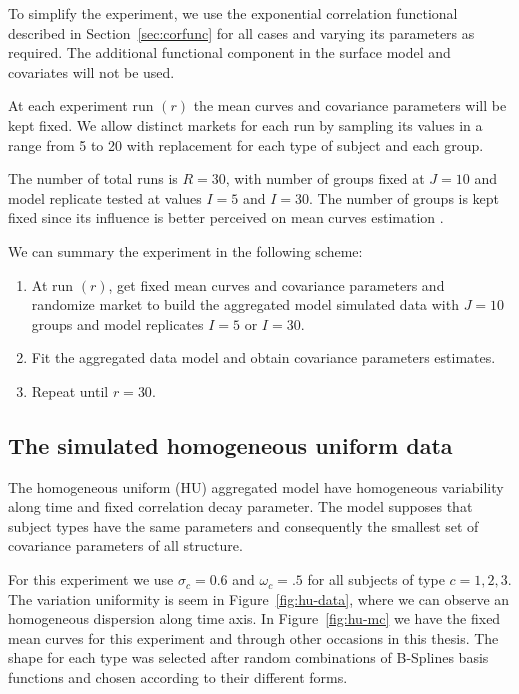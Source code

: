To simplify the experiment, we use the exponential correlation functional described in Section~\ref{sec:corfunc} for all cases and varying its parameters as required. The additional functional component in the surface model and covariates will not be used.%

At each experiment run $(r)$ the mean curves and covariance parameters will be kept fixed. We allow distinct markets for each run by sampling its values in a range from 5 to 20 with replacement for each type of subject and each group. 

The number of total runs is $R=30$, with number of groups fixed at $J=10$ and model replicate tested at values $I=5$ and $I=30$. The number of groups is kept fixed since its influence is better perceived on mean curves estimation \cite{dias2009non,dias2013hierarchical}.

We can summary the experiment in the following scheme:

\begin{enumerate}
\item At run $(r)$, get fixed mean curves and covariance parameters and randomize market to build the aggregated model simulated data with $J=10$ groups and model replicates $I=5$ or $I=30$.
\item Fit the aggregated data model and obtain covariance parameters estimates.
\item Repeat until $r=30$.
\end{enumerate}





\subsection{The simulated homogeneous uniform data}
\label{sec:hu-fit}


The homogeneous uniform (HU) aggregated model have homogeneous variability along time and fixed correlation decay parameter. The model supposes that subject types have the same parameters and consequently the smallest set of covariance parameters of all structure.

For this experiment we use $\sigma_c = 0.6$ and $\omega_c = .5$ for all subjects of type $c = 1,2,3$. The variation uniformity is seem in Figure~\ref{fig:hu-data}, where we can observe an homogeneous dispersion along time axis. In Figure~\ref{fig:hu-mc} we have the fixed mean curves for this experiment and through other occasions in this thesis. The shape for each type was selected after random combinations of B-Splines basis functions and chosen according to their different forms.

